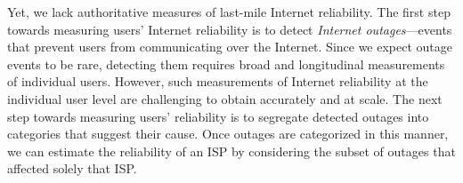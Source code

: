 


Yet, we lack authoritative measures of last-mile Internet reliability. The first step towards measuring users' Internet
reliability is to detect \emph{Internet outages}---events that prevent
users from communicating over the Internet. Since we expect outage
events to be rare, detecting them requires broad and longitudinal
measurements of individual users. However, such measurements of
Internet reliability at the individual user level are challenging to
obtain accurately and at scale. The next step towards measuring users'
reliability is to segregate detected outages into categories
that suggest their cause. Once outages are categorized in this
manner, we can estimate the reliability of an ISP by considering the
subset of outages that affected solely that ISP.

